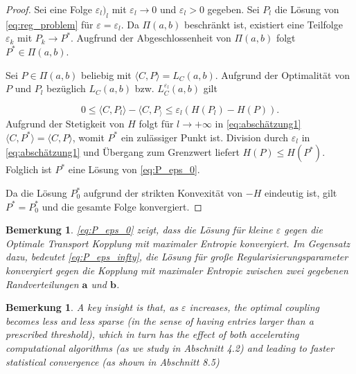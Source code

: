 \documentclass[11pt,a4paper]{article}
\newtheorem{remark}[theorem]{Bemerkung}
\numberwithin{equation}{section}
\begin{document}
	\begin{proof}
		Sei eine Folge $\varepsilon_l)_l$ mit $\varepsilon_l \to 0$ und $\varepsilon_l > 0$ gegeben. Sei $P_l$ die Lösung von  \autoref{eq:reg_problem} für $\varepsilon = \varepsilon_l$. Da $\Pi(a,b)$ beschränkt ist, existiert eine Teilfolge $\varepsilon_k$ mit $P_k \to P^*$. Augfrund der Abgeschlossenheit von $\Pi(a,b)$ folgt $P^* \in \Pi(a,b)$.
		
		Sei $P \in \Pi (a,b)$ beliebig mit $\langle C, P \rangle = L_C(a,b)$. Aufgrund der Optimalität von $P$ und $P_l$ bezüglich $L_C(a,b)$ bzw. $L_C^{\varepsilon_l}(a,b)$ gilt
		
		\begin{equation}
			0 \leq \langle C, P_l\rangle - \langle C, P_\rangle \leq \varepsilon_l (H(P_l)-H(P)). \label{eq:abschätzung1}
		\end{equation}
		Aufgrund der Stetigkeit von $H$ folgt für $l \to +\infty$ in \autoref{eq:abschätzung1} $\langle C, P^* \rangle = \langle C, P \rangle$, womit $P^*$ ein zulässiger Punkt ist. Division durch $\varepsilon_l$ in \autoref{eq:abschätzung1} und Übergang zum Grenzwert liefert $H(P)\leq H(P^*)$. Folglich ist $P^*$ eine Lösung von \autoref{eq:P_eps_0}.
		
		Da die Lösung $P_0^*$ aufgrund der strikten Konvexität von $-H$ eindeutig ist, gilt $P^* = P_0^*$ und die gesamte Folge konvergiert.
		
		
	\end{proof}
	
	\begin{remark}
		\autoref{eq:P_eps_0} zeigt, dass die Lösung für kleine $\varepsilon$ gegen die Optimale Transport Kopplung mit maximaler Entropie konvergiert. Im Gegensatz dazu, bedeutet \autoref{eq:P_eps_infty}, die Lösung für große Regularisierungsparameter konvergiert gegen die Kopplung mit maximaler Entropie zwischen zwei gegebenen Randverteilungen $\boldsymbol{a}$ und $\boldsymbol{b}$.\\
		
	\end{remark}
	
	\begin{remark}
		A key insight is that, as $\varepsilon$ increases, the optimal coupling
		becomes less and less sparse (in the sense of having entries larger than a prescribed
		threshold), which in turn has the effect of both accelerating computational algorithms
		(as we study in Abschnitt 4.2) and leading to faster statistical convergence (as shown in Abschnitt 8.5)
	\end{remark}
	
\end{document}
